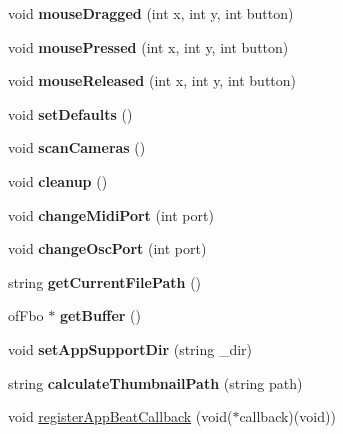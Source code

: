 \begin{DoxyCompactItemize}
\mbox{\label{class_engine_a428c8e164c2f0f01b07d8179ff6e21e0}} 
void {\bfseries mouse\+Dragged} (int x, int y, int button)
\item 
\mbox{\label{class_engine_a7ce4ba1856c33c19ee104fcd6bb47633}} 
void {\bfseries mouse\+Pressed} (int x, int y, int button)
\item 
\mbox{\label{class_engine_a5f8775f5a9fa94f608bce7b07a4e711a}} 
void {\bfseries mouse\+Released} (int x, int y, int button)
\item 
\mbox{\label{class_engine_a276e8d0c9e083bc5adab1ccade6b6674}} 
void {\bfseries set\+Defaults} ()
\item 
\mbox{\label{class_engine_a0116b74bb312164086fe9ee3e5fd9d5b}} 
void {\bfseries scan\+Cameras} ()
\item 
\mbox{\label{class_engine_a18dcb065818c6ec7e76168452eb45001}} 
void {\bfseries cleanup} ()
\item 
\mbox{\label{class_engine_a9e7f54a907c2e058295edba5a59ef578}} 
void {\bfseries change\+Midi\+Port} (int port)
\item 
\mbox{\label{class_engine_ab5e53de6ca336844026f6cf4858abd77}} 
void {\bfseries change\+Osc\+Port} (int port)
\item 
\mbox{\label{class_engine_add90fd5f0eb935ef688127c741baa35e}} 
string {\bfseries get\+Current\+File\+Path} ()
\item 
\mbox{\label{class_engine_a69aa9d5f07000a38eaaeae6c5f33f800}} 
of\+Fbo $\ast$ {\bfseries get\+Buffer} ()
\item 
\mbox{\label{class_engine_a1fbd799ded9ac4b7a27f57ff0364468e}} 
void {\bfseries set\+App\+Support\+Dir} (string \+\_\+dir)
\item 
\mbox{\label{class_engine_a5307012b50388efb4e359540e328c468}} 
string {\bfseries calculate\+Thumbnail\+Path} (string path)
\item 
void \hyperlink{class_engine_a3cf7820fd1dc335f82218ec6a9ef355b}{register\+App\+Beat\+Callback} (void($\ast$callback)(void))
\end{DoxyCompactItemize}
